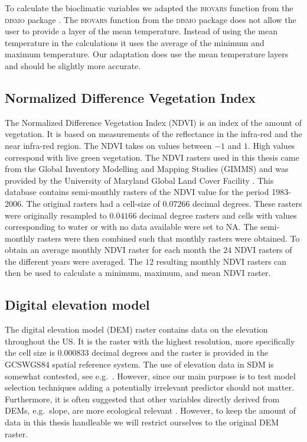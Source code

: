 To calculate the bioclimatic variables we adapted the \textsc{biovars} function from the \textsc{dismo} package \parencite{dismo}. The \textsc{biovars} function from the \textsc{dismo} package does not allow the user to provide a layer of the mean temperature. Instead of using the mean temperature in the calculations it uses the average of the minimum and maximum temperature. Our adaptation does use the mean temperature layers and should be slightly more accurate.

\subsection{Normalized Difference Vegetation Index}
The Normalized Difference Vegetation Index (NDVI) is an index of the amount of vegetation. It is based on measurements of the reflectance in the infra-red and the near infra-red region. The NDVI takes on values between $-1$ and $1$. High values correspond with live green vegetation. The NDVI rasters used in this thesis came from the Global Inventory Modelling and Mapping Studies (GIMMS) and was provided by the University of Maryland Global Land Cover Facility \parencite{pinzon2005satellite, tucker2005extended}. This database contains semi-monthly rasters of the NDVI value for the period 1983-2006. The original rasters had a cell-size of $0.07266$ decimal degrees. These rasters were originally  resampled to $0.04166$ decimal degree rasters and cells with values corresponding to water or with no data available were set to \textsc{NA}. The semi-monthly rasters were then combined such that monthly rasters were obtained. To obtain an average monthly NDVI raster for each month the $24$ NDVI rasters of the different years were averaged. The $12$ resulting monthly NDVI rasters can then be used to calculate a minimum, maximum, and mean NDVI raster.

\subsection{Digital elevation model}
The digital elevation model (DEM) raster \parencite{DEM} contains data on the elevation throughout the US. It is the raster with the highest resolution, more specifically the cell size is $0.000833$ decimal degrees and the raster is provided in the GCS\textunderscore WGS84 spatial reference system. The use of elevation data in SDM is somewhat contested, see e.g.\ \cite{hof_usefulness_2012, oke_distribution_2015}. However, since our main purpose is to test model selection techniques adding a potentially irrelevant predictor should not matter. Furthermore, it is often suggested that other variables directly derived from DEMs, e.g.\ slope, are more ecological relevant \parencite{franklin_mapping_2009}. However, to keep the amount of data in this thesis handleable we will restrict ourselves to the original DEM raster.



